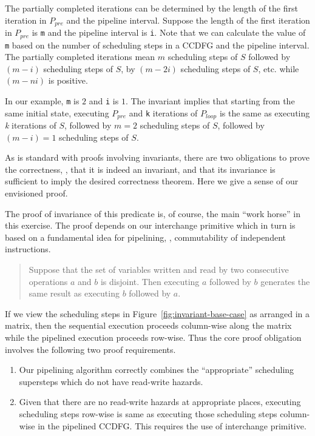 The partially completed iterations can be determined by the
length of the first iteration in $P_{pre}$ and the pipeline interval.
Suppose the length of the first iteration in $P_{pre}$
is {\tt m} and the pipeline interval is {\tt i}. Note that we
can calculate the value of {\tt m} based on the number of scheduling steps in a CCDFG
and the pipeline interval. The partially completed iterations mean $m$
scheduling steps of $S$ followed by $(m-i)$ scheduling steps of $S$, by
$(m-2i)$ scheduling steps of $S$, etc. while $(m-ni)$ is positive.

In our example, {\tt m} is $2$
and {\tt i} is $1$.  The invariant implies that starting
from the same initial state, executing $P_{pre}$ and {\tt k}
iterations of $P_{loop}$ is the same as executing {\em k}
iterations of $S$, followed by $m = 2$ scheduling steps of
$S$, followed by $ (m - i) = 1$ scheduling steps of $S$.

As is standard with proofs involving invariants, there are
two obligations to prove the correctness, \viz, that it is indeed
an invariant, and that its invariance is sufficient to imply
the desired correctness theorem.  Here we give a sense of
our envisioned proof.

The proof of invariance of this predicate is, of course, the
main ``work horse'' in this exercise.  The proof depends on
our interchange primitive which in turn is based on a fundamental idea for pipelining,
\viz, commutability of independent instructions.

\begin{quote}
Suppose that the
set of variables written and read by two consecutive
operations $a$ and $b$ is disjoint.  Then executing $a$
followed by $b$ generates the same result as executing $b$
followed by $a$.
\end{quote}

If we view the scheduling steps in
Figure~\ref{fig:invariant-base-case} as arranged in a
matrix, then the sequential execution proceeds column-wise
along the matrix while the pipelined execution proceeds
row-wise.  Thus the core proof obligation involves the
following two proof requirements.

\begin{enumerate}[--]
\item Our pipelining algorithm correctly combines the
  ``appropriate'' scheduling supersteps which do not have
  read-write hazards.
\item Given that there are no read-write hazards at
  appropriate places, executing scheduling steps row-wise is
  same as executing those scheduling steps column-wise in
  the pipelined CCDFG.  This requires the use of interchange primitive.
\end{enumerate}

